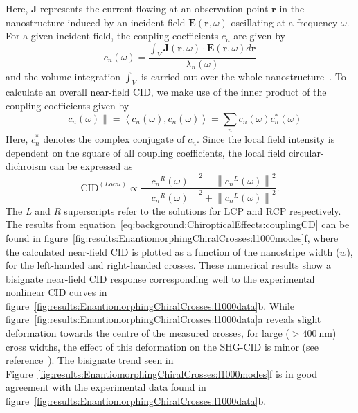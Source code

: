 Here, $\mathbf{J}$ represents the current flowing at an observation point $\mathbf{r}$ in the nanostructure induced by an incident field $\mathbf{E}(\mathbf{r}, \omega)$ oscillating at a frequency $\omega$. For a given incident field, the coupling coefficients $c_n$ are given by
\begin{equation}\label{eq:background:ChiropticalEffects:couplingCoefficients}	
	c_n(\omega) = \frac{\int_{V} \mathbf{J}(\mathbf{r}, \omega) \cdot \mathbf{E}(\mathbf{r}, \omega) d\mathbf{r}}{\lambda_{n}(\omega)}
\end{equation}
and the volume integration $\int_{V}$ is carried out over the whole nanostructure~\cite{Zheng2013}. 
To calculate an overall near-field CID, we make use of the inner product of the coupling coefficients given by
\begin{equation}\label{eq:background:ChiropticalEffects:couplingInnerProduct}	
	\left\| c_{n}(\omega ) \right\| = \left\langle c_{n}(\omega),c_{n}(\omega) \right\rangle = \sum\limits_n c_{n}(\omega) c_{n}^* (\omega)
\end{equation}
Here, $c_{n}^*$ denotes the complex conjugate of $c_{n}$.
Since the local field intensity is dependent on the square of all coupling coefficients, the local field circular-dichroism can be expressed as
\begin{equation}\label{eq:background:ChiropticalEffects:couplingCD}	
	\mathrm{CID}^{(Local)} \propto \frac{{\left\| {{c_n}^R(\omega )} \right\|}^2 - {\left\| {{c_n}^L(\omega )} \right\|}^2}{{\left\| {{c_n}^R(\omega )} \right\|}^2 + {\left\| {{c_n}^L(\omega )} \right\|}^2}.
\end{equation}
The \textit{L} and \textit{R} superscripts refer to the solutions for LCP and RCP respectively. 
The results from equation~\ref{eq:background:ChiropticalEffects:couplingCD} can be found in figure~\ref{fig:results:EnantiomorphingChiralCrosses:l1000modes}f, where the calculated near-field CID is plotted as a function of the nanostripe width ($w$), for the left-handed and right-handed crosses. These numerical results show a bisignate near-field CID response corresponding well to the experimental nonlinear CID curves in figure~\ref{fig:results:EnantiomorphingChiralCrosses:l1000data}b. 
While figure~\ref{fig:results:EnantiomorphingChiralCrosses:l1000data}a reveals slight deformation towards the centre of the measured crosses, for large ($>\SI{400}{\nano\m}$) cross widths, the effect of this deformation on the SHG-CID is minor (see reference~\cite{Valev2014}). 
The bisignate trend seen in Figure~\ref{fig:results:EnantiomorphingChiralCrosses:l1000modes}f is in good agreement with the experimental data found in figure~\ref{fig:results:EnantiomorphingChiralCrosses:l1000data}b.

